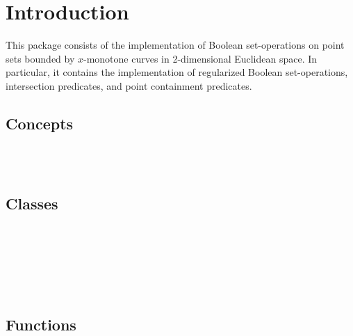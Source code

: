 \section*{Introduction}
\label{bobs_ref_sec:intro}
%
This package consists of the implementation of Boolean set-operations
on point sets bounded by $x$-monotone curves in 2-dimensional
Euclidean space. In particular, it contains the implementation of
regularized Boolean set-operations, intersection predicates, and point
containment predicates.

\subsection*{Concepts}

\\
\\

\subsection*{Classes}

\\
\\
\\
\\
\\

\subsection*{Functions}

